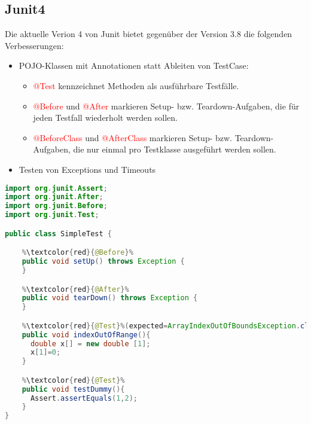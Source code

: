 \subsection{Junit4}
Die aktuelle Verion 4 von Junit bietet gegenüber der Version 3.8
die folgenden Verbesserungen:
\begin{itemize}
\item POJO-Klassen mit Annotationen statt Ableiten von TestCase:
\begin{itemize}
\item \textcolor{red}{@Test} kennzeichnet Methoden als ausführbare Testfälle.
\item \textcolor{red}{@Before} und \textcolor{red}{@After}
  markieren Setup- bzw. Teardown-Aufgaben, die
  für jeden Testfall wiederholt werden sollen.
\item \textcolor{red}{@BeforeClass} und \textcolor{red}{@AfterClass}
  markieren Setup-
  bzw. Teardown-Aufgaben, die nur einmal pro Testklasse ausgeführt
  werden sollen.
\end{itemize}
\item Testen von Exceptions und Timeouts
\end{itemize}
\newslide
\begin{lstlisting}[language=java,escapechar=\%]
import org.junit.Assert;
import org.junit.After;
import org.junit.Before;
import org.junit.Test;

public class SimpleTest {

    %\textcolor{red}{@Before}%
    public void setUp() throws Exception {
    }

    %\textcolor{red}{@After}%
    public void tearDown() throws Exception {
    }

    %\textcolor{red}{@Test}%(expected=ArrayIndexOutOfBoundsException.class)
    public void indexOutOfRange(){
      double x[] = new double [1];
      x[1]=0;
    }

    %\textcolor{red}{@Test}%
    public void testDummy(){
      Assert.assertEquals(1,2);
    }
}
\end{lstlisting}
%
%
\newslide

